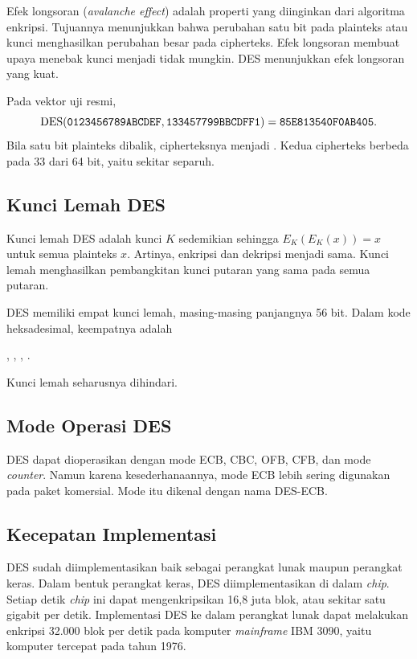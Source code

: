 Efek longsoran (\textit{avalanche effect}) adalah properti yang diinginkan
dari algoritma enkripsi. Tujuannya menunjukkan bahwa perubahan satu bit pada
plainteks atau kunci menghasilkan perubahan besar pada cipherteks. Efek
longsoran membuat upaya menebak kunci menjadi tidak mungkin. DES menunjukkan
efek longsoran yang kuat.

Pada vektor uji resmi,
\[
\mathrm{DES}(\texttt{0123456789ABCDEF}, \texttt{133457799BBCDFF1})
= \texttt{85E813540F0AB405}.
\]
Bila satu bit plainteks dibalik, cipherteksnya menjadi
. Kedua cipherteks berbeda pada 33 dari 64 bit, yaitu
sekitar separuh.

\subsection{Kunci Lemah DES}

Kunci lemah DES adalah kunci $K$ sedemikian sehingga $E_K(E_K(x)) = x$ untuk
semua plainteks $x$. Artinya, enkripsi dan dekripsi menjadi sama. Kunci lemah
menghasilkan pembangkitan kunci putaran yang sama pada semua putaran.

DES memiliki empat kunci lemah, masing-masing panjangnya 56 bit. Dalam kode
heksadesimal, keempatnya adalah
\begin{center}
, \quad {}, \quad
{}, \quad {}.
\end{center}
Kunci lemah seharusnya dihindari.

\subsection{Mode Operasi DES}

DES dapat dioperasikan dengan mode ECB, CBC, OFB, CFB, dan mode
\textit{counter}. Namun karena kesederhanaannya, mode ECB lebih sering
digunakan pada paket komersial. Mode itu dikenal dengan nama DES-ECB.

\subsection{Kecepatan Implementasi}

DES sudah diimplementasikan baik sebagai perangkat lunak maupun perangkat
keras. Dalam bentuk perangkat keras, DES diimplementasikan di dalam
\textit{chip}. Setiap detik \textit{chip} ini dapat mengenkripsikan 16,8 juta
blok, atau sekitar satu gigabit per detik. Implementasi DES ke dalam perangkat
lunak dapat melakukan enkripsi 32.000 blok per detik pada komputer
\textit{mainframe} IBM 3090, yaitu komputer tercepat pada tahun 1976.
